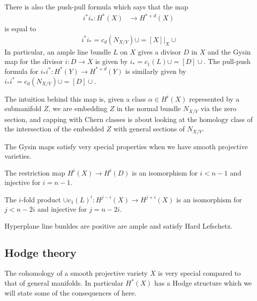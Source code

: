 \documentclass[12pt]{article}
\begin{document}
\hfill 

There is also the push-pull formula which says that the map \begin{align*}
    i^*i_*:H^*(X) &\to H^{*+d}(X)\
\end{align*} is equal to \begin{align*}
    i^*i_* = c_d(N_{X/Y})\cup = [X]\vert_X\cup
\end{align*} In particular, an ample line bundle $L$ on $X$ gives a divisor $D$ in $X$ and
the Gysin map for the divisor $i:D\to X$ is given by $i_* = c_1(L)\cup = [D] \cup$.
The pull-push formula for $i_*i^*: H^*(Y) \to H^{*+d}(Y)$ is similarly
 given by $i_*i^* = c_d(N_{X/Y})\cup = [D]\cup$.

\begin{remark}
    The intuition behind this map is, given a class $\alpha \in H^i(X)$ represented by 
a submanifold $Z$, we are embedding $Z$ in the normal bundle $N_{X/Y}$ via the zero section,
and capping with Chern classes is about looking at the homology class of 
the intersection of the embedded $Z$ with general sections of $N_{X/Y}$.
\end{remark}

The Gysin maps satisfy very special properties when we have smooth projective varieties.
\begin{theorem}
     The restriction map $H^i(X)\to H^i(D)$ is an isomorphism for 
    $i < n-1 $ and injective for $i = n-1$.
\end{theorem}

\begin{theorem}
    The $i$-fold product $\cup c_1(L)^i:H^{j-i}(X)\to H^{j+i}(X)$ is 
    an isomorphism for $j < n-2i$ and injective for $j = n-2i$.
\end{theorem}

\begin{remark}
    Hyperplane line bunldes are positive are ample and satisfy Hard Lefschetz.
\end{remark}
\subsection{Hodge theory}
The cohomology of a smooth projective variety $X$ is very special 
compared to that of general manifolds. In particular $H^*(X)$ has a Hodge structure
which we will state some of the consequences of here.

\hfill 
\end{document}
